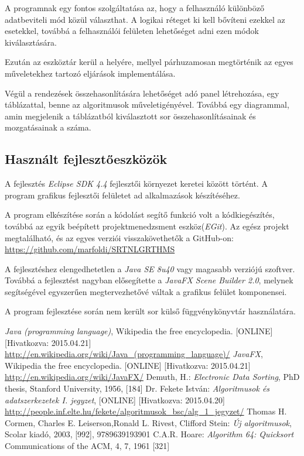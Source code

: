 \documentclass{elteikthesis}
\begin{document}
A programnak egy fontos szolgáltatása az, hogy a felhasználó különböző adatbeviteli mód közül választhat. A logikai réteget ki kell bővíteni ezekkel az esetekkel, továbbá a felhasználói felületen lehetőséget adni ezen módok kiválasztására.\par
Ezután az eszköztár kerül a helyére, mellyel párhuzamosan megtörténik az egyes műveletekhez tartozó eljárások implementálása.\par
Végül a rendezések összehasonlítására lehetőséget adó panel létrehozása, egy táblázattal, benne az algoritmusok műveletigényével. Továbbá egy diagrammal, amin megjelenik a táblázatból kiválasztott sor összehasonlításainak és mozgatásainak a száma.


\subsection{Használt fejlesztőeszközök}
A fejlesztés \emph{Eclipse SDK 4.4} fejlesztői környezet keretei között történt. A program grafikus fejlesztői felületet ad alkalmazások készítéséhez.\par
A program elkészítése során a kódolást segítő funkció volt a kódkiegészítés, továbbá az egyik beépített projektmenedzsment eszköz(\emph{EGit}). Az egész projekt megtalálható, és az egyes verziói visszakövethetők a GitHub-on: \url{https://github.com/marfoldi/SRTNLGRTHMS}\par
A fejlesztéshez elengedhetetlen a \emph{Java SE 8u40} vagy magasabb verziójú szoftver. Továbbá a fejlesztést nagyban elősegítette a \emph{JavaFX Scene Builder 2.0}, melynek segítségével egyszerűen megtervezhetővé váltak a grafikus felület komponensei.\par
A program fejlesztése során nem került sor külső függvénykönyvtár használatára.
\begin{thebibliography}{widest entry}
\emph{Java (programming language)},
Wikipedia the free encyclopedia.
[ONLINE] [Hivatkozva: 2015.04.21]
\url{http://en.wikipedia.org/wiki/Java_(programming_language)/}
\emph{JavaFX},
Wikipedia the free encyclopedia.
[ONLINE] [Hivatkozva: 2015.04.21]
\url{http://en.wikipedia.org/wiki/JavaFX/}
Demuth, H.:
\emph{Electronic Data Sorting},
PhD thesis, Stanford University,
1956, [184]
Dr. Fekete István:
\emph{Algoritmusok és adatszerkezetek I. jegyzet},
[ONLINE] [Hivatkozva: 2015.04.20] \url{http://people.inf.elte.hu/fekete/algoritmusok_bsc/alg_1_jegyzet/}
Thomas H. Cormen, Charles E. Leiserson,Ronald L. Rivest, Clifford Stein:
\emph{Új algoritmusok},
Scolar kiadó, 2003,
[992], 9789639193901
C.A.R. Hoare:
\emph{Algorithm 64: Quicksort}
Communications of the ACM, 4, 7, 1961
[321]
\end{thebibliography}
\end{document}
